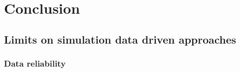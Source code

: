 


\chapter{Conclusion} %

\label{Chapter5} %


\section{Limits on simulation data driven approaches}



\subsection{Data reliability}


